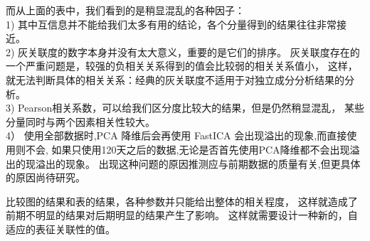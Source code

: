 而从上面的表中，我们看到的是稍显混乱的各种因子：\\
  1)  其中互信息并不能给我们太多有用的结论，各个分量得到的结果往往非常接近。\\
  2)  灰关联度的数字本身并没有太大意义，重要的是它们的排序。 
      灰关联度存在的一个严重问题是，较强的负相关关系得到的值会比较弱的相关关系值小，
      这样，就无法判断具体的相关关系：经典的灰关联度不适用于对独立成分分析结果的分析。\\
  3) Pearson相关系数，可以给我们区分度比较大的结果，但是仍然稍显混乱，
      某些分量同时与两个因素相关性较大。\\
  4） 使用全部数据时,PCA 降维后会再使用 FastICA 会出现溢出的现象,而直接使用则不会,
      如果只使用120天之后的数据,无论是否首先使用PCA降维都不会出现溢出的现溢出的现象。
      出现这种问题的原因推测应与前期数据的质量有关,但更具体的原因尚待研究。


比较图的结果和表的结果，各种参数并只能给出整体的相关程度，
这样就造成了前期不明显的结果对后期明显的结果产生了影响。
这样就需要设计一种新的，自适应的表征关联性的值。


